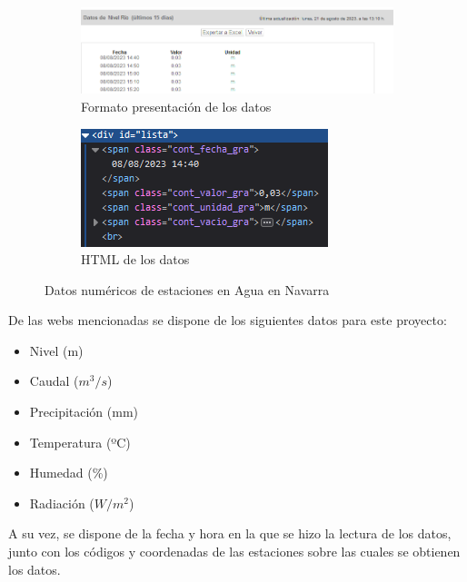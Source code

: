 \begin{figure} [H]
	\centering
	\begin{subfigure}{.5\textwidth}
		\centering
		\includegraphics[width=.9\linewidth]{fig/AguaEnNavarraData.png}
		\caption{Formato presentación de los datos}
		\label{fig:sub3}
	\end{subfigure}%
	\begin{subfigure}{.5\textwidth}
		\centering
		\includegraphics[width=.7\linewidth]{fig/AguaEnNavarraDataHTML.png}
		\caption{HTML de los datos}
		\label{fig:sub4}
	\end{subfigure}
	\caption{Datos numéricos de estaciones en Agua en Navarra}
	\label{fig:ej26}
\end{figure}

De las webs mencionadas se dispone de los siguientes datos para este proyecto:

\begin{itemize}
	\setlength\itemsep{0.5em}
	\item Nivel (m)
	\item Caudal ($m^3/s$)
	\item Precipitación (mm)
	\item Temperatura (ºC)
	\item Humedad (\%)
	\item Radiación ($W/m^2$)
\end{itemize}

A su vez, se dispone de la fecha y hora en la que se hizo la lectura de los datos, junto con los códigos y coordenadas de las estaciones sobre las cuales se obtienen los datos.